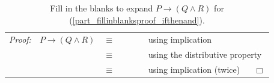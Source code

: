 \begin{act}
\begin{actpart}
        \begin{table}[hbtp]
            \centering
            \begin{tabular} {lrclll}
                \emph{Proof:} & $P \to (Q \land R)$ & $\equiv$ & \underline{\hspace{1in}} & ~\hspace{.25in}~& using implication  \\ 
                && $\equiv$ & \underline{\hspace{1in}} && using the distributive property \\ 
                && $\equiv$ & \underline{\hspace{1in}} && using implication (twice) ~ \hfill ~$\Box$ \\ 
            \end{tabular}
            \caption{Fill in the blanks to expand $P \to (Q \land R)$ for  (\ref{part_fillinblanksproof_ifthenand}).}
            \label{tab_fillinblanksproof_ifthenand}
        \end{table}


\end{actpart}
\end{act}
